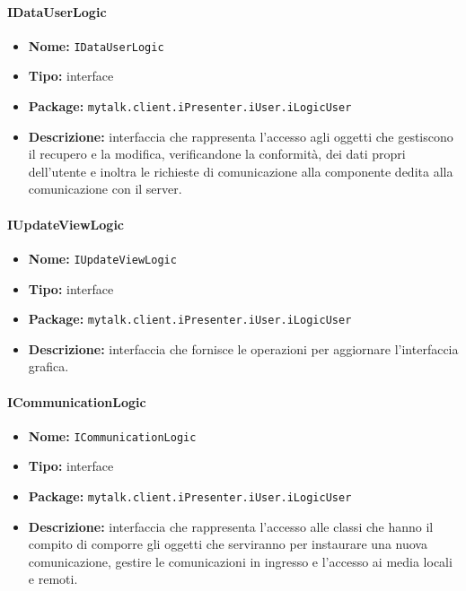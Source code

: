 \paragraph{IDataUserLogic}{
	\begin{itemize}
		\item [] \textbf{Nome:} \texttt{IDataUserLogic}
		\item [] \textbf{Tipo:} interface
		\item [] \textbf{Package:} \texttt{mytalk.client.iPresenter.iUser.iLogicUser}
		\item [] \textbf{Descrizione:}{ interfaccia che rappresenta l'accesso agli oggetti che gestiscono il recupero e la modifica, verificandone la conformità, dei dati propri dell'utente e inoltra le richieste di comunicazione alla componente dedita alla comunicazione con il server\g .}
	\end{itemize}
}
\paragraph{IUpdateViewLogic}{
	\begin{itemize}
		\item [] \textbf{Nome:} \texttt{IUpdateViewLogic}
		\item [] \textbf{Tipo:} interface
		\item [] \textbf{Package:} \texttt{mytalk.client.iPresenter.iUser.iLogicUser}
		\item [] \textbf{Descrizione:}{ interfaccia che fornisce le operazioni per aggiornare l'interfaccia grafica.}
	\end{itemize}
}
\paragraph{ICommunicationLogic}{
	\begin{itemize}
		\item [] \textbf{Nome:} \texttt{ICommunicationLogic}
		\item [] \textbf{Tipo:} interface
		\item [] \textbf{Package:} \texttt{mytalk.client.iPresenter.iUser.iLogicUser}
		\item [] \textbf{Descrizione:}{ interfaccia che rappresenta l'accesso alle classi che hanno il compito di comporre gli oggetti che serviranno per instaurare una nuova comunicazione, gestire le comunicazioni in ingresso e l'accesso ai media locali e remoti.}
	\end{itemize}
}



